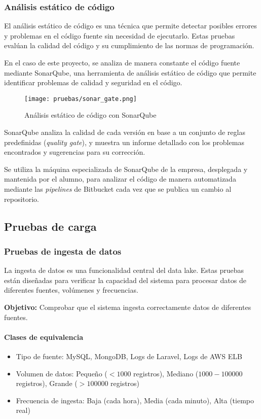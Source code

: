 \newpage{}
\subsubsection{Análisis estático de código}
El análisis estático de código es una técnica que permite detectar posibles
errores y problemas en el código fuente sin necesidad de ejecutarlo. Estas
pruebas evalúan la calidad del código y su cumplimiento de las normas de
programación.

En el caso de este proyecto, se analiza de manera constante el código fuente
mediante SonarQube, una herramienta de análisis estático de código que permite
identificar problemas de calidad y seguridad en el código.

\begin{figure}[H]
	\centering
	\texttt{[image: pruebas/sonar\_gate.png]}
	\caption{Análisis estático de código con SonarQube}
	\label{fig:sonarqube}
\end{figure}

SonarQube analiza la calidad de cada versión en base a un conjunto de reglas
predefinidas (\textit{quality gate}), y muestra un informe detallado con los
problemas encontrados y sugerencias para su corrección.

Se utiliza la máquina especializada de SonarQube de la empresa, desplegada y
mantenida por el alumno, para analizar el código de manera automatizada mediante
las \textit{pipelines} de Bitbucket cada vez que se publica un cambio al
repositorio.


\newpage{}
\subsection{Pruebas de carga}
\subsubsection{Pruebas de ingesta de datos}
La ingesta de datos es una funcionalidad central del data lake. Estas pruebas
están diseñadas para verificar la capacidad del sistema para procesar datos de
diferentes fuentes, volúmenes y frecuencias.

\textbf{Objetivo:} Comprobar que el sistema ingesta correctamente datos de
diferentes fuentes.

\paragraph{Clases de equivalencia}
\begin{itemize}
    \item Tipo de fuente: MySQL, MongoDB, Logs de Laravel, Logs de AWS ELB
    \item Volumen de datos: Pequeño ($<1000$ registros), Mediano ($1000-100000$
    	registros), Grande ($>100000$ registros)
    \item Frecuencia de ingesta: Baja (cada hora), Media (cada minuto), Alta
    	(tiempo real)
\end{itemize}

